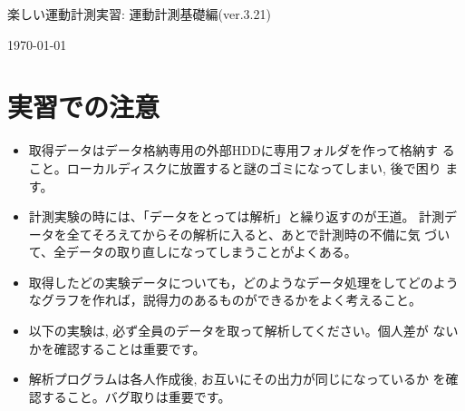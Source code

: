 \documentclass{jsarticle}
\def\version{3.21}
\begin{document}
\begin{center}
  {\LARGE 楽しい運動計測実習: 運動計測基礎編(ver.\version)}
\end{center}
\begin{flushright}
\today
\end{flushright}

\section*{実習での注意}
\begin{itemize}
\item 取得データはデータ格納専用の外部HDDに専用フォルダを作って格納す
  ること。ローカルディスクに放置すると謎のゴミになってしまい, 後で困り
  ます。
\item 計測実験の時には、「データをとっては解析」と繰り返すのが王道。
  計測データを全てそろえてからその解析に入ると、あとで計測時の不備に気
  づいて、全データの取り直しになってしまうことがよくある。
\item 取得したどの実験データについても，どのようなデータ処理をしてどのようなグラフを作れば，説得力のあるものができるかをよく考えること。
\item 以下の実験は, 必ず全員のデータを取って解析してください。個人差が
  ないかを確認することは重要です。
\item 解析プログラムは各人作成後, お互いにその出力が同じになっているか
  を確認すること。バグ取りは重要です。
\end{itemize}

\end{document}
